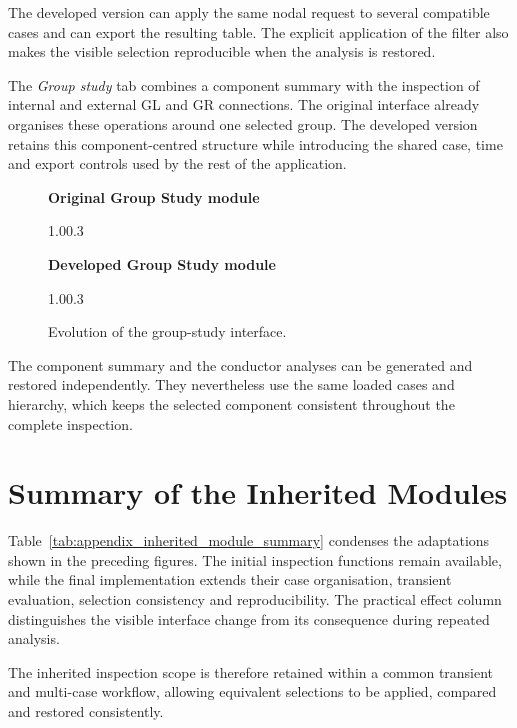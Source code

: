 The developed version can apply the same nodal request to several compatible
cases and can export the resulting table. The explicit application of the
filter also makes the visible selection reproducible when the analysis is
restored.

\clearpage

The \textit{Group study} tab combines a component summary with the inspection
of internal and external GL and GR connections. The original interface already
organises these operations around one selected group. The developed version
retains this component-centred structure while introducing the shared case,
time and export controls used by the rest of the application.

\begin{figure}[H]
    \centering
    \textbf{Original Group Study module}\par\vspace{0.2em}
        {1.0\textwidth}{0.3\textheight}

    \vspace{0.2em}
    \textbf{Developed Group Study module}\par\vspace{0.2em}
        {1.0\textwidth}{0.3\textheight}

    \caption{Evolution of the group-study interface.}
    \label{fig:appendix_group_study_evolution}
\end{figure}

The component summary and the conductor analyses can be generated and restored
independently. They nevertheless use the same loaded cases and hierarchy, which
keeps the selected component consistent throughout the complete inspection.

\section{Summary of the Inherited Modules}
\label{appsec:inherited_modules_summary}

Table~\ref{tab:appendix_inherited_module_summary} condenses the adaptations
shown in the preceding figures. The initial inspection functions remain
available, while the final implementation extends their case organisation,
transient evaluation, selection consistency and reproducibility. The practical
effect column distinguishes the visible interface change from its consequence
during repeated analysis.



The inherited inspection scope is therefore retained within a common transient
and multi-case workflow, allowing equivalent selections to be applied,
compared and restored consistently.

\endgroup
